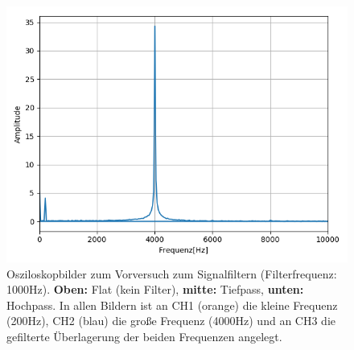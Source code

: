 \documentclass[12pt,a4paper]{article}
\begin{document}
\begin{figure}
\includegraphics[scale=0.5]{Bilder/Vorversuch3/Vor3_2.png}
\caption{Osziloskopbilder zum Vorversuch zum Signalfiltern (Filterfrequenz: 1000Hz). \textbf{Oben:} Flat (kein Filter), \textbf{mitte:} Tiefpass, \textbf{unten:} Hochpass.
In allen Bildern ist an CH1 (orange) die kleine Frequenz (200Hz), CH2 (blau) die große Frequenz (4000Hz) und an CH3 die gefilterte Überlagerung der beiden Frequenzen angelegt.}
\label{fig:Vor3_Oszi}
\end{figure}
\end{document}
